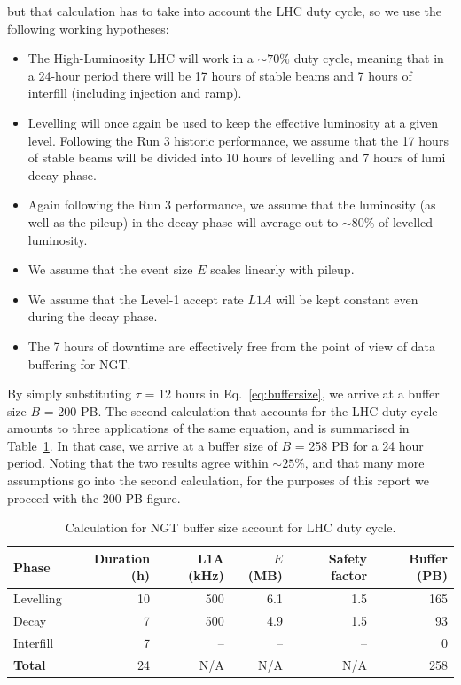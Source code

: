 \begin{itemize}
but that calculation has to take into account the LHC duty cycle, so we use the following working hypotheses:
\begin{itemize}
\item The High-Luminosity LHC will work in a $\sim70\%$ duty cycle, meaning that in a 24-hour period there will be 17 hours of stable beams and 7 hours of interfill (including injection and ramp).
\item Levelling will once again be used to keep the effective luminosity at a given level.
Following the Run 3 historic performance, we assume that the 17 hours of stable beams will be divided into 10 hours of levelling and 7 hours of lumi decay phase.
\item Again following the Run 3 performance, we assume that the luminosity (as well as the pileup) in the decay phase will average out to $\sim80\%$ of levelled luminosity.
\item We assume that the event size $E$ scales linearly with pileup.
\item We assume that the Level-1 accept rate $L1A$ will be kept constant even during the decay phase. 
\item The 7 hours of downtime are effectively free from the point of view of data buffering for NGT.
\end{itemize}
\end{itemize}

By simply substituting $\tau$ = 12 hours in Eq.~\ref{eq:buffersize}, we arrive at a buffer size $B$ = 200 PB.
The second calculation that accounts for the LHC duty cycle amounts to three applications of the same equation,
and is summarised in Table~\ref{tab:bufferWithDutyCycle}. In that case, we arrive at a buffer size of $B$ = 258 PB for a 24 hour period.
Noting that the two results agree within $\sim25\%$, and that many more assumptions go into the second calculation, for the purposes of this report we proceed with the 200 PB figure.
\begin{table}[htbp]
   \centering
   \begin{tabular}{@{} lrrrrr @{}} %
      \toprule
		Phase & Duration (h) & L1A (kHz) & $E$ (MB) & Safety factor & Buffer (PB)\\
      	\midrule
		Levelling & 10 & 500 & 6.1 & 1.5 & 165 \\
		Decay     &  7 & 500 & 4.9 & 1.5 &  93 \\
		Interfill &  7 &  -- &  -- &  -- &   0 \\
		\midrule
\textbf{Total}    & 24 & N/A & N/A & N/A & 258\\ 
      \bottomrule
   \end{tabular}
   \caption{Calculation for NGT buffer size account for LHC duty cycle.}
   \label{tab:bufferWithDutyCycle}
\end{table}
